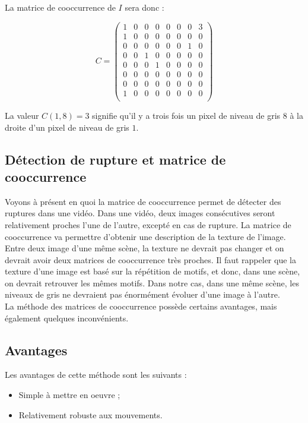 La matrice de cooccurrence de $I$ sera donc :

\[
 C = \begin{pmatrix}
     1 & 0 & 0 & 0 & 0 & 0 & 0 & 3 \\
     1 & 0 & 0 & 0 & 0 & 0 & 0 & 0 \\
     0 & 0 & 0 & 0 & 0 & 0 & 1 & 0 \\
     0 & 0 & 1 & 0 & 0 & 0 & 0 & 0 \\
     0 & 0 & 0 & 1 & 0 & 0 & 0 & 0 \\
     0 & 0 & 0 & 0 & 0 & 0 & 0 & 0 \\
     0 & 0 & 0 & 0 & 0 & 0 & 0 & 0 \\
     1 & 0 & 0 & 0 & 0 & 0 & 0 & 0 \\   
 \end{pmatrix}
\]

La valeur $C(1, 8) = 3$ signifie qu'il y a trois fois un pixel de niveau de gris $8$ à la droite d'un pixel de niveau de gris $1$.

\subsection{Détection de rupture et matrice de cooccurrence}

Voyons à présent en quoi la matrice de cooccurrence permet de détecter des ruptures dans une vidéo. Dans une vidéo, deux images consécutives seront relativement proches l'une de l'autre, excepté en cas de rupture. La matrice de cooccurrence va permettre d'obtenir une description de la texture de l'image. Entre deux image d'une même scène, la texture ne devrait pas changer et on devrait avoir deux matrices de cooccurrence très proches. Il faut rappeler que la texture d'une image est basé sur la répétition de motifs, et donc, dans une scène, on devrait retrouver les mêmes motifs. Dans notre cas, dans une même scène, les niveaux de gris ne devraient pas énormément évoluer d'une image à l'autre.\\

La méthode des matrices de cooccurrence possède certains avantages, mais également quelques inconvénients.

\subsection{Avantages}

Les avantages de cette méthode sont les suivants :

\begin{itemize}
	\item Simple à mettre en oeuvre ;
	\item Relativement robuste aux mouvements.
\end{itemize}

